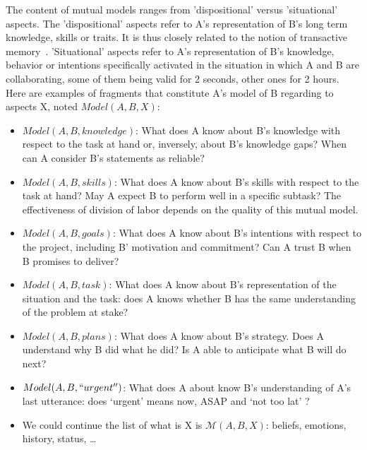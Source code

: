 \documentclass[twocolumn]{article}
\newcommand{\model}[3]{{$\mathcal{M}(#1, #2, #3)$}}
\begin{document}
The content of mutual models ranges from 'dispositional' versus 'situational'
aspects. The 'dispositional' aspects refer to A's representation of B's long
term knowledge, skills or traits. It is thus closely related to the notion of
transactive memory~\citep{wegner1987transactive, moreland1999transactive}.
'Situational' aspects refer to A's representation of B's knowledge, behavior or
intentions specifically activated in the situation in which A and B are
collaborating, some of them being valid for 2 seconds, other ones for 2 hours.
Here are examples of fragments that constitute A's model of B regarding to
aspects X, noted $Model(A,B,X)$:

\begin{itemize}

    \item $Model(A,B, knowledge)$: What does A know about B's knowledge with
        respect to the task at hand or, inversely, about B's knowledge gaps?
        When can A consider B's statements as reliable? 

    \item $Model(A,B, skills)$: What does A know about B's skills with respect to
        the task at hand? May A expect B to perform well in a specific subtask?
        The effectiveness of division of labor depends on the quality of this
        mutual model. 

    \item $Model(A,B, goals)$: What does A know about B's intentions with respect
        to the project, including B' motivation and commitment? Can A trust B
        when B promises to deliver? 

    \item $Model(A,B, task)$: What does A know about B's representation of the
        situation and the task: does A knows whether B has the same
        understanding of the problem at stake? 

    \item $Model(A,B, plans)$: What does A know about B's strategy. Does A
        understand why B did what he did? Is A able to anticipate what B will do
        next? 

    \item $Model(A,B, ``urgent'')$: What does A about know B's understanding of A's
        last utterance: does ‘urgent' means now, ASAP and ‘not too lat' ?

    \item We could continue the list of what is X is \model{A}{B}{X}: beliefs,
        emotions, history, status, …

\end{itemize}
\end{document}
